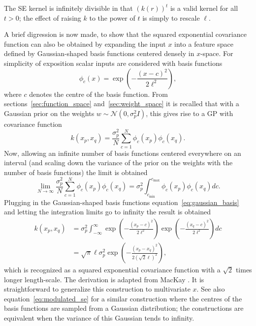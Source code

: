 \documentclass[11pt]{book}
\begin{document}
The SE kernel is infinitely divisible in that $(k(r))^t$ is a valid kernel for all $t > 0$; the effect of raising $k$ to the power of $t$ is simply to rescale $\ell$.

A brief digression is now made, to show that the squared exponential covariance function can also be obtained by expanding the input $x$ into a feature space defined by Gaussian-shaped basis functions centered densely in $x$-space. For simplicity of exposition scalar inputs are considered with basis functions
\begin{equation}
\label{eq:gaussian_basis}
\phi_c(x) = \exp\left(-\frac{(x-c)^2}{2\ell^2}\right),
\end{equation}
where $c$ denotes the centre of the basis function. From sections~\ref{sec:function_space} and~\ref{sec:weight_space} it is recalled that with a Gaussian prior on the weights $w \sim \mathcal{N}(0, \sigma_p^2 I)$, this gives rise to a GP with covariance function
\begin{equation}
\label{eq:finite_basis_cov}
k(x_p, x_q) = \frac{\sigma_p^2}{N} \sum_{c=1}^N \phi_c(x_p) \phi_c(x_q).
\end{equation}
Now, allowing an infinite number of basis functions centered everywhere on an interval (and scaling down the variance of the prior on the weights with the number of basis functions) the limit is obtained
\begin{equation}
\label{eq:infinite_basis_limit}
\lim_{N \to \infty} \frac{\sigma_p^2}{N} \sum_{c=1}^N \phi_c(x_p) \phi_c(x_q) = \sigma_p^2 \int_{c_{\min}}^{c_{\max}} \phi_c(x_p) \phi_c(x_q) dc.
\end{equation}
Plugging in the Gaussian-shaped basis functions equation~\eqref{eq:gaussian_basis} and letting the integration limits go to infinity the result is obtained
\begin{align}
\label{eq:se_derivation}
k(x_p, x_q) &= \sigma_p^2 \int_{-\infty}^\infty \exp\left(-\frac{(x_p-c)^2}{2\ell^2}\right) \exp\left(-\frac{(x_q-c)^2}{2\ell^2}\right) dc \\
&= \sqrt{\pi}\ell\sigma_p^2 \exp\left(-\frac{(x_p-x_q)^2}{2(\sqrt{2}\ell)^2}\right), \nonumber
\end{align}
which is recognized as a squared exponential covariance function with a $\sqrt{2}$ times longer length-scale. The derivation is adapted from MacKay \cite{mackay1998}. It is straightforward to generalize this construction to multivariate $x$. See also equation~\eqref{eq:modulated_se} for a similar construction where the centres of the basis functions are sampled from a Gaussian distribution; the constructions are equivalent when the variance of this Gaussian tends to infinity.
\end{document}
